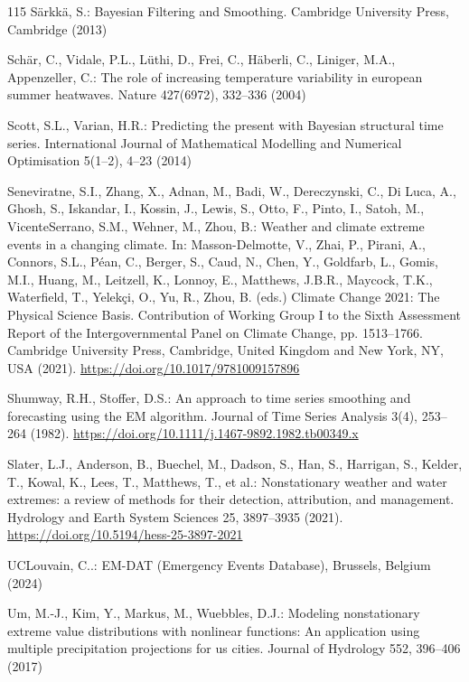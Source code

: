 \documentclass[11pt,a4paper]{article}
\begin{document}
\begin{thebibliography}{115}
		Särkkä, S.: Bayesian Filtering and Smoothing. Cambridge University Press, Cambridge (2013)
		
		Schär, C., Vidale, P.L., Lüthi, D., Frei, C., Häberli, C., Liniger, M.A., Appenzeller, C.: The role of increasing temperature variability in european summer heatwaves. Nature 427(6972), 332--336 (2004)
		
		Scott, S.L., Varian, H.R.: Predicting the present with Bayesian structural time series. International Journal of Mathematical Modelling and Numerical Optimisation 5(1--2), 4--23 (2014)
		
		Seneviratne, S.I., Zhang, X., Adnan, M., Badi, W., Dereczynski, C., Di Luca, A., Ghosh, S., Iskandar, I., Kossin, J., Lewis, S., Otto, F., Pinto, I., Satoh, M., VicenteSerrano, S.M., Wehner, M., Zhou, B.: Weather and climate extreme events in a changing climate. In: Masson-Delmotte, V., Zhai, P., Pirani, A., Connors, S.L., Péan, C., Berger, S., Caud, N., Chen, Y., Goldfarb, L., Gomis, M.I., Huang, M., Leitzell, K., Lonnoy, E., Matthews, J.B.R., Maycock, T.K., Waterfield, T., Yelekçi, O., Yu, R., Zhou, B. (eds.) Climate Change 2021: The Physical Science Basis. Contribution of Working Group I to the Sixth Assessment Report of the Intergovernmental Panel on Climate Change, pp. 1513--1766. Cambridge University Press, Cambridge, United Kingdom and New York, NY, USA (2021). \url{https://doi.org/10.1017/9781009157896}
		
		Shumway, R.H., Stoffer, D.S.: An approach to time series smoothing and forecasting using the EM algorithm. Journal of Time Series Analysis 3(4), 253--264 (1982). \url{https://doi.org/10.1111/j.1467-9892.1982.tb00349.x}
		
		Slater, L.J., Anderson, B., Buechel, M., Dadson, S., Han, S., Harrigan, S., Kelder, T., Kowal, K., Lees, T., Matthews, T., et al.: Nonstationary weather and water extremes: a review of methods for their detection, attribution, and management. Hydrology and Earth System Sciences 25, 3897--3935 (2021). \url{https://doi.org/10.5194/hess-25-3897-2021}
		
		UCLouvain, C..: EM-DAT (Emergency Events Database), Brussels, Belgium (2024)
		
		Um, M.-J., Kim, Y., Markus, M., Wuebbles, D.J.: Modeling nonstationary extreme value distributions with nonlinear functions: An application using multiple precipitation projections for us cities. Journal of Hydrology 552, 396--406 (2017)
		

\end{thebibliography}
\end{document}
